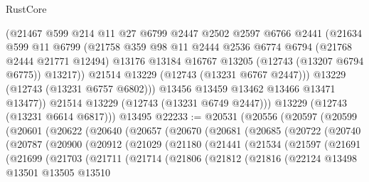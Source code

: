 \begin{lexlean}{RustCore}
\begin{coremodule}
              (@21467
                @599
                @214
                @11
                @27
                @6799
                @2447
                @2502
                @2597
                @6766
                @2441
                (@21634
                  @599
                  @11
                  @6799
                  (@21758
                    @359
                    @98
                    @11
                    @2444
                    @2536
                    @6774
                    @6794
                    (@21768 @2444 @21771 @12494)
                    @13176
                    @13184
                    @16767
                    @13205
                    (@12743 (@13207 @6794 @6775))
                    @13217))
                @21514
                @13229
                (@12743 (@13231 @6767 @2447)))
              @13229
              (@12743 (@13231 @6757 @6802)))
            @13456
            @13459
            @13462
            @13466
            @13471
            @13477))
        @21514
        @13229
        (@12743 (@13231 @6749 @2447)))
      @13229
      (@12743 (@13231 @6614 @6817)))
    @13495
@22233 := @20531
    (@20556
      (@20597
        (@20599
          (@20601
            (@20622
              (@20640
                (@20657
                  (@20670
                    (@20681
                      (@20685
                        (@20722
                          (@20740
                            (@20787
                              (@20900
                                (@20912
                                  (@21029
                                    (@21180
                                      (@21441
                                        (@21534
                                          (@21597
                                            (@21691
                                              (@21699
                                                (@21703
                                                  (@21711
                                                    (@21714
                                                      (@21806
                                                        (@21812
                                                          (@21816
                                                            (@22124
                                                              @13498
                                                              @13501
                                                              @13505
                                                              @13510

\end{coremodule}
\end{lexlean}
